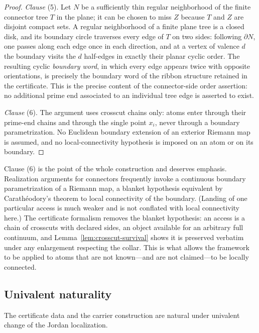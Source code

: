 \begin{proof}
\emph{Clause} (5).  Let $N$ be a sufficiently thin regular neighborhood of
the finite connector tree $T$ in the plane; it can be chosen to miss $Z$
because $T$ and $Z$ are disjoint compact sets.  A regular neighborhood of a finite plane tree is a closed
disk, and its boundary circle traverses every edge of $T$ on two sides:
following $\partial N$, one passes along each edge once in each
direction, and at a vertex of valence $d$ the boundary visits the $d$
half-edges in exactly their planar cyclic order.  The resulting cyclic
\emph{boundary word}, in which every edge appears twice with opposite
orientations, is precisely the boundary word of the ribbon structure
retained in the certificate.  This is the precise content of the
connector-side order assertion: no additional prime end associated to an
individual tree edge is asserted to exist.

\emph{Clause} (6).  The argument uses crosscut chains only: atoms enter
through their prime-end chains and through the single point $x_i$, never
through a boundary parametrization.  No Euclidean boundary extension of
an exterior Riemann map is assumed, and no local-connectivity hypothesis
is imposed on an atom or on its boundary.
\end{proof}

\begin{remark}\label{rem:C-no-lc}
Clause (6) is the point of the whole construction and deserves emphasis.
Realization arguments for connectors frequently invoke a continuous
boundary parametrization of a Riemann map, a blanket hypothesis equivalent
by Carath\'eodory's theorem to local connectivity of the boundary.
(Landing of one particular access is much weaker and is not conflated with
local connectivity here.)  The certificate formalism removes the blanket
hypothesis: an access is a chain of crosscuts with declared sides,
an object available for an arbitrary full continuum, and
Lemma~\ref{lem:crosscut-survival} shows it is preserved verbatim under
any enlargement respecting the collar.  This is what allows the framework
to be applied to atoms that are not
known---and are not claimed---to be locally connected.
\end{remark}

\subsection*{Univalent naturality}
The certificate data and the carrier construction are natural under
univalent change of the Jordan localization.

